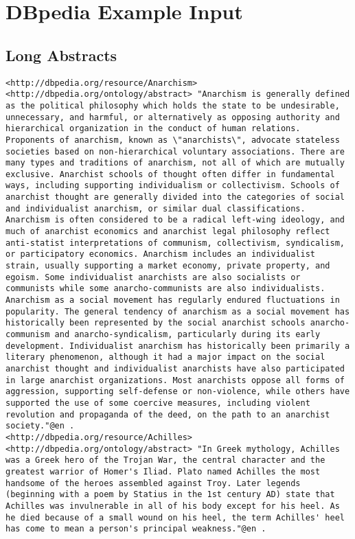 \chapter{DBpedia Example Input}
\label{appendix:dbpedia}
\singlespace

\section{Long Abstracts}
\begin{lstlisting}[breaklines, basicstyle=\small]
<http://dbpedia.org/resource/Anarchism> <http://dbpedia.org/ontology/abstract> "Anarchism is generally defined as the political philosophy which holds the state to be undesirable, unnecessary, and harmful, or alternatively as opposing authority and hierarchical organization in the conduct of human relations. Proponents of anarchism, known as \"anarchists\", advocate stateless societies based on non-hierarchical voluntary associations. There are many types and traditions of anarchism, not all of which are mutually exclusive. Anarchist schools of thought often differ in fundamental ways, including supporting individualism or collectivism. Schools of anarchist thought are generally divided into the categories of social and individualist anarchism, or similar dual classifications. Anarchism is often considered to be a radical left-wing ideology, and much of anarchist economics and anarchist legal philosophy reflect anti-statist interpretations of communism, collectivism, syndicalism, or participatory economics. Anarchism includes an individualist strain, usually supporting a market economy, private property, and egoism. Some individualist anarchists are also socialists or communists while some anarcho-communists are also individualists. Anarchism as a social movement has regularly endured fluctuations in popularity. The general tendency of anarchism as a social movement has historically been represented by the social anarchist schools anarcho-communism and anarcho-syndicalism, particularly during its early development. Individualist anarchism has historically been primarily a literary phenomenon, although it had a major impact on the social anarchist thought and individualist anarchists have also participated in large anarchist organizations. Most anarchists oppose all forms of aggression, supporting self-defense or non-violence, while others have supported the use of some coercive measures, including violent revolution and propaganda of the deed, on the path to an anarchist society."@en .
<http://dbpedia.org/resource/Achilles> <http://dbpedia.org/ontology/abstract> "In Greek mythology, Achilles was a Greek hero of the Trojan War, the central character and the greatest warrior of Homer's Iliad. Plato named Achilles the most handsome of the heroes assembled against Troy. Later legends (beginning with a poem by Statius in the 1st century AD) state that Achilles was invulnerable in all of his body except for his heel. As he died because of a small wound on his heel, the term Achilles' heel has come to mean a person's principal weakness."@en .

\end{lstlisting}
